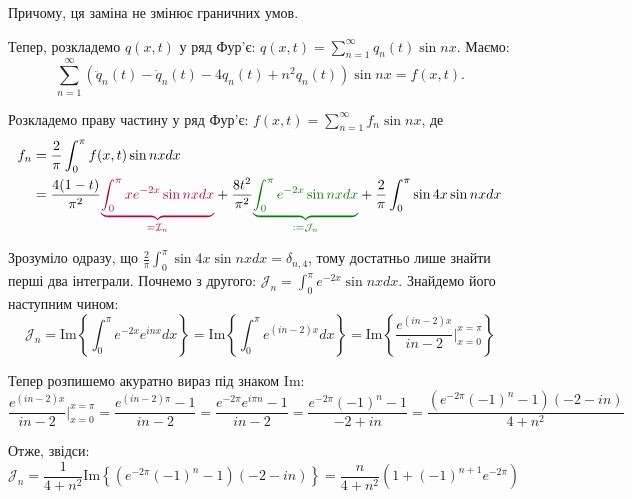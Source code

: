 \documentclass{hw_template}
\begin{document}
Причому, ця заміна не змінює граничних умов.

Тепер, розкладемо $q(x,t)$ у ряд Фур'є: $q(x,t) = \sum_{n=1}^{\infty} q_n(t)
\sin nx$. Маємо:
\begin{equation*}
    \sum_{n=1}^{\infty} (\ddot{q}_n(t) - \dot{q}_n(t) - 4q_n(t) + n^2q_n(t))\sin nx = f(x,t).
\end{equation*}

Розкладемо праву частину у ряд Фур'є: $f(x,t) = \sum_{n=1}^{\infty} f_n\sin nx$, де
\begin{align*}
    f_n &= \frac{2}{\pi}\int_0^{\pi} f(x,t)\sin nx dx \\
    &= \frac{4(1-t)}{\pi^2} \textcolor{purple}{\underbrace{\int_0^{\pi}xe^{-2x}\sin nxdx}_{=\mathcal{I}_n}} + \frac{8t^2}{\pi^2} \textcolor{green!50!black}{\underbrace{\int_0^{\pi}e^{-2x}\sin nx dx}_{:=\mathcal{J}_n}} + \frac{2}{\pi}\int_0^{\pi}\sin 4x \sin nx dx
\end{align*}

Зрозуміло одразу, що $\frac{2}{\pi}\int_0^{\pi}\sin 4x \sin nx dx =
\delta_{n,4}$, тому достатньо лише знайти перші два інтеграли. Почнемо 
з другого: $\mathcal{J}_n = \int_0^{\pi}e^{-2x}\sin nx dx$. Знайдемо 
його наступним чином:
\begin{equation*}
    \mathcal{J}_n = \text{Im}\left\{ \int_0^{\pi} e^{-2x}e^{inx}dx \right\}
    = \text{Im}\left\{ \int_0^{\pi} e^{(in-2)x}dx \right\} = \text{Im}\left\{ \frac{e^{(in-2)x}}{in-2}\Big|_{x=0}^{x=\pi} \right\}
\end{equation*}

Тепер розпишемо акуратно вираз під знаком $\text{Im}$:
\begin{equation*}
    \frac{e^{(in-2)x}}{in-2}\Big|_{x=0}^{x=\pi} = \frac{e^{(in-2)\pi} - 1}{in-2}
    = \frac{e^{-2\pi}e^{i\pi n} - 1}{in-2} = \frac{e^{-2\pi}(-1)^n - 1}{-2+in} = \frac{(e^{-2\pi}(-1)^n-1)(-2-in)}{4+n^2}
\end{equation*}

Отже, звідси:
\begin{equation*}
    \mathcal{J}_n = \frac{1}{4+n^2}\text{Im}\left\{ (e^{-2\pi}(-1)^n-1)(-2-in) \right\} = \frac{n}{4+n^2}(1 + (-1)^{n+1}e^{-2\pi})
\end{equation*}
\end{document}
